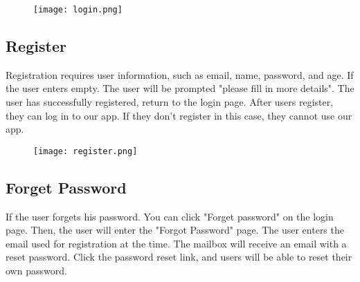 \documentclass[conference]{IEEEtran}
\begin{document}
        \begin{figure}[h]
        \begin{center}
        \centering
        \texttt{[image: login.png]}
        \caption{}
        \label{fig:my_label}
        \end{center}
        \end{figure}
        
    \subsection{Register}
    
        Registration requires user information, such as email, name, password, and age. If the user enters empty. The user will be prompted "please fill in more details". The user has successfully registered, return to the login page. After users register, they can log in to our app. If they don’t register in this case, they cannot use our app.
        
        \begin{figure}[h]
        \begin{center}
        \centering
        \texttt{[image: register.png]}
        \caption{}
        \label{fig:my_label}
        \end{center}
        \end{figure}
        \vspace{1\baselineskip}\vspace{1\baselineskip}\vspace{1\baselineskip}\vspace{1\baselineskip}\vspace{1\baselineskip}\vspace{1\baselineskip}\vspace{1\baselineskip}\vspace{1\baselineskip}\vspace{1\baselineskip}\vspace{1\baselineskip}
        
    \subsection{Forget Password}
        If the user forgets his password. You can click "Forget password" on the login page. Then, the user will enter the "Forgot Password" page. The user enters the email used for registration at the time. The mailbox will receive an email with a reset password. Click the password reset link, and users will be able to reset their own password.
        
\end{document}
